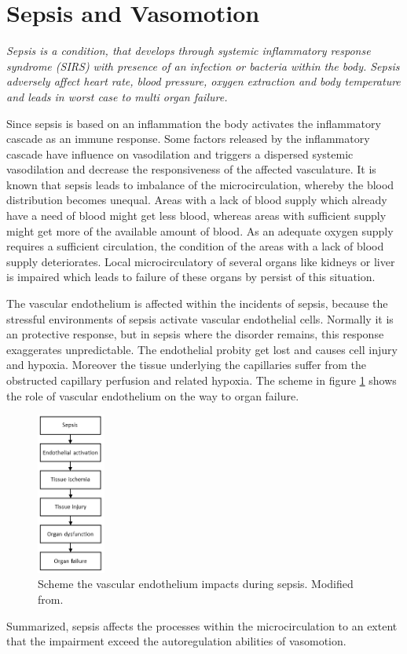 
\label{chap:sepsis}
\section{Sepsis and Vasomotion}

\textit{Sepsis is a condition, that develops through systemic inflammatory response syndrome (SIRS) with presence of an infection or bacteria within the body. Sepsis adversely affect heart rate, blood pressure, oxygen extraction and body temperature and leads in worst case to multi organ failure.\cite{pluta2010,kanta2014}}

Since sepsis is based on an inflammation the body activates the inflammatory cascade as an immune response. Some factors released by the inflammatory cascade have influence on vasodilation and triggers a dispersed systemic vasodilation and decrease the responsiveness of the affected vasculature. It is known that sepsis leads to imbalance of the microcirculation, whereby the blood distribution becomes unequal. Areas with a lack of blood supply which already have a need of blood might get less blood, whereas areas with sufficient supply might get more of the available amount of blood. As an adequate oxygen supply requires a sufficient circulation, the condition of the areas with a lack of blood supply deteriorates.
Local microcirculatory of several organs like kidneys or liver is impaired which leads to failure of these organs by persist of this situation.\cite{baudouin2008,kanta2014}

The vascular endothelium is affected within the incidents of sepsis, because the stressful environments of sepsis activate vascular endothelial cells. Normally it is an protective response, but in sepsis where the disorder remains, this response exaggerates unpredictable. The endothelial probity get lost and causes cell injury and hypoxia. Moreover the tissue underlying the capillaries suffer from the obstructed capillary perfusion and related hypoxia. The scheme in figure \ref{fig:Sepsis} shows the role of vascular endothelium on the way to organ failure.\cite{baudouin2008}

\begin{figure}[H]
	\centering	\includegraphics[width=0.2\textwidth]{figures/SepsisEndo}
	\caption{Scheme the vascular endothelium impacts during sepsis. Modified from\cite{baudouin2008}.}
	\label{fig:Sepsis}
\end{figure}

Summarized, sepsis affects the processes within the microcirculation to an extent that the impairment exceed the autoregulation abilities of vasomotion.